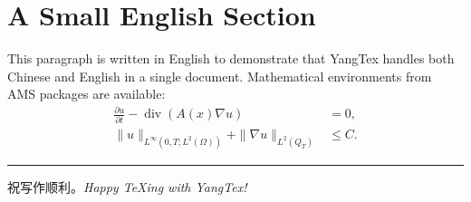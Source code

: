 \documentclass[11pt,a4paper,fontset=fandol]{ctexart}
\newcommand{\Om}{\Omega}
\DeclareMathOperator{\divg}{div}
\begin{document}
\section{A Small English Section}
This paragraph is written in English to demonstrate that YangTex handles
both Chinese and English in a single document. Mathematical environments
from \textsc{AMS} packages are available:
\begin{align}
  \frac{\partial u}{\partial t} - \divg(A(x)\nabla u) &= 0, \\
  \|u\|_{L^\infty(0,T;L^2(\Om))} + \|\nabla u\|_{L^2(Q_T)} &\le C.
\end{align}

\bigskip
\noindent\rule{\linewidth}{0.4pt}
\begin{center}
\small 祝写作顺利。\quad \textit{Happy \TeX ing with YangTex!}
\end{center}
\end{document}
